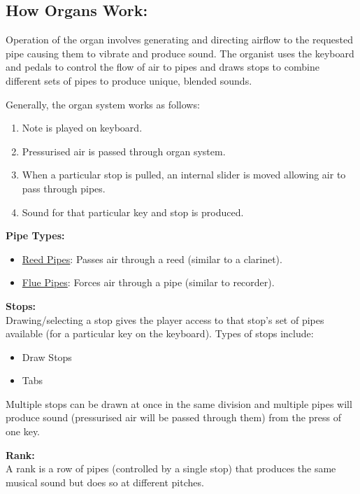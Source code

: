 \noindent \subsection{How Organs Work:}
\hspace{0.5cm} Operation of the organ involves generating and directing airflow to the requested pipe causing them to vibrate and produce sound. The organist uses the keyboard and pedals to control the flow of air to pipes and draws stops to combine different sets of pipes to produce unique, blended sounds.  \cite{organvideo}

\noindent Generally, the organ system works as follows:
\begin{enumerate}
\item Note is played on keyboard.
\item Pressurised air is passed through organ system.
\item When a particular stop is pulled, an internal slider is moved allowing air to pass through pipes.
\item Sound for that particular key and stop is produced.
\end{enumerate}

\noindent \textbf{Pipe Types:}
\begin{itemize}
\item \underline{Reed Pipes}: Passes air through a reed (similar to a clarinet).
\item \underline{Flue Pipes}: Forces air through a pipe (similar to recorder).
\end{itemize}
\cite{organvideo}

\noindent \textbf{Stops:}
\\ \hspace*{0.5cm}Drawing/selecting a stop gives the player access to that stop's set of pipes available (for a particular key on the keyboard). Types of stops include:
\begin{itemize}
\item Draw Stops
\item Tabs
\end{itemize}

Multiple stops can be drawn at once in the same division and multiple pipes will produce sound (pressurised air will be passed through them) from the press of one key. \cite{organvideo}

\medskip
\noindent \textbf{Rank:}
\\ \hspace*{0.5cm} A rank is a row of pipes (controlled by a single stop) that produces the same musical sound but does so at different pitches. 

